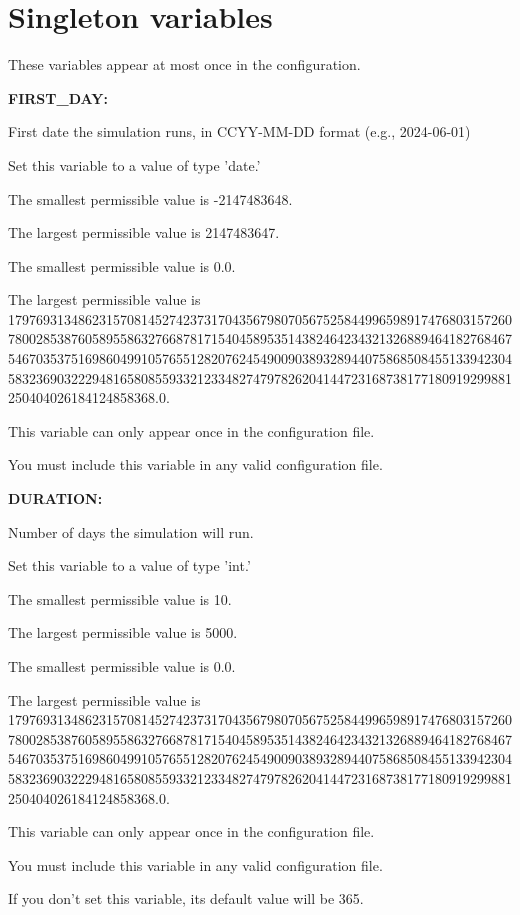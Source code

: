 \section{Singleton variables}


These variables appear at most once in the configuration.


\textbf{FIRST\_DAY:}


First date the simulation runs, in CCYY-MM-DD format (e.g., 2024-06-01)

Set this variable to a value of type 'date.'

The smallest permissible value is -2147483648.

The largest permissible value is 2147483647.

The smallest permissible value is 0.0.

The largest permissible value is 179769313486231570814527423731704356798070567525844996598917476803157260780028538760589558632766878171540458953514382464234321326889464182768467546703537516986049910576551282076245490090389328944075868508455133942304583236903222948165808559332123348274797826204144723168738177180919299881250404026184124858368.0.

This variable can only appear once in the configuration file.

You must include  this variable in any valid configuration file.


\textbf{DURATION:}


Number of days the simulation will run.

Set this variable to a value of type 'int.'

The smallest permissible value is 10.

The largest permissible value is 5000.

The smallest permissible value is 0.0.

The largest permissible value is 179769313486231570814527423731704356798070567525844996598917476803157260780028538760589558632766878171540458953514382464234321326889464182768467546703537516986049910576551282076245490090389328944075868508455133942304583236903222948165808559332123348274797826204144723168738177180919299881250404026184124858368.0.

This variable can only appear once in the configuration file.

You must include  this variable in any valid configuration file.

If you don't set this variable, its default value will be 365.


